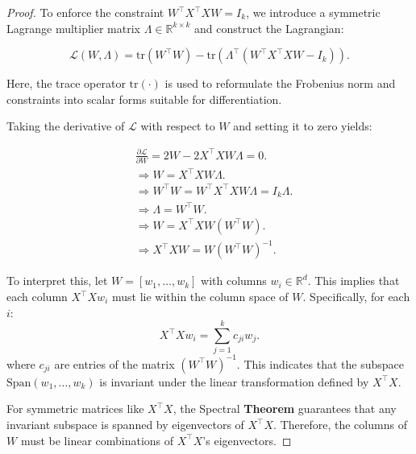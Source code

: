 \begin{proof}

To enforce the constraint \(W^\top X^\top X W = I_k\), we introduce a symmetric Lagrange multiplier matrix \(\Lambda \in \mathbb{R}^{k \times k}\) and construct the Lagrangian:

\begin{equation}
    \mathcal{L}(W, \Lambda) = \text{tr}(W^\top W) - \text{tr}\left(\Lambda^\top (W^\top X^\top X W - I_k)\right).    
\end{equation}

Here, the trace operator \(\text{tr}(\cdot)\) is used to reformulate the Frobenius norm and constraints into scalar forms suitable for differentiation.


Taking the derivative of \(\mathcal{L}\) with respect to \(W\) and setting it to zero yields:

\begin{equation}
\begin{aligned}
 & \frac{\partial \mathcal{L}}{\partial W} = 2W - 2 X^\top X W \Lambda = 0. \\
& \Rightarrow W = X^\top X W \Lambda. \\
& \Rightarrow W^\top W = W^\top X^\top X W \Lambda = I_k \Lambda . \\
& \Rightarrow  \Lambda = W^\top W. \\
& \Rightarrow   W = X^\top X W (W^\top W). \\
& \Rightarrow  X^\top X W = W (W^\top W)^{-1}.
\end{aligned}
\end{equation}



To interpret this, let \(W = [w_1, \dots, w_k]\) with columns \(w_i \in \mathbb{R}^d\). This implies that each column \(X^\top X w_i\) must lie within the column space of \(W\). Specifically, for each \(i\):
\begin{equation}
    X^\top X w_i = \sum_{j=1}^k c_{ji} w_j.    
\end{equation}
where \(c_{ji}\) are entries of the matrix \((W^\top W)^{-1}\). This indicates that the subspace \(\text{Span}(w_1, \dots, w_k)\) is invariant under the linear transformation defined by \(X^\top X\).

For symmetric matrices like \(X^\top X\), the Spectral \textbf{Theorem} guarantees that any invariant subspace is spanned by eigenvectors of \(X^\top X\). Therefore, the columns of \(W\) must be linear combinations of \(X^\top X\)'s eigenvectors.



\end{proof}
